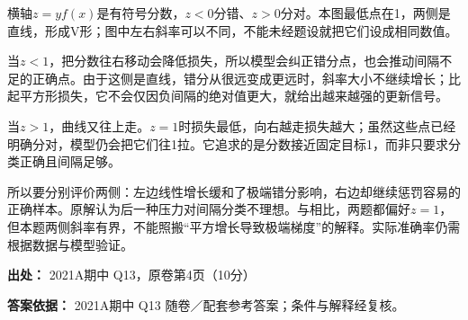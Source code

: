 横轴\(z=yf(x)\)是有符号分数，\(z<0\)分错、\(z>0\)分对。本图最低点在1，两侧是直线，形成V形；图中左右斜率可以不同，不能未经题设就把它们设成相同数值。


当\(z<1\)，把分数往右移动会降低损失，所以模型会纠正错分点，也会推动间隔不足的正确点。由于这侧是直线，错分从很远变成更远时，斜率大小不继续增长；比起平方形损失，它不会仅因负间隔的绝对值更大，就给出越来越强的更新信号。


当\(z>1\)，曲线又往上走。\(z=1\)时损失最低，向右越走损失越大；虽然这些点已经明确分对，模型仍会把它们往1拉。它追求的是分数接近固定目标1，而非只要求分类正确且间隔足够。


所以要分别评价两侧：左边线性增长缓和了极端错分影响，右边却继续惩罚容易的正确样本。原解认为后一种压力对间隔分类不理想。与相比，两题都偏好\(z=1\)，但本题两侧斜率有界，不能照搬“平方增长导致极端梯度”的解释。实际准确率仍需根据数据与模型验证。


\textbf{出处：} 2021A期中 Q13，原卷第4页（10分）


\textbf{答案依据：} 2021A期中 Q13 随卷／配套参考答案；条件与解释经复核。
